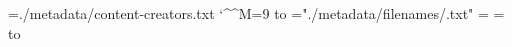 \newread\ccRead
\newread\fnameRead
\newread\fanNameRead

\newtoks\ccName
\obeylines

\openin\ccRead=./metadata/content-creators.txt
\catcode`\^^M=9
\loop
\read\ccRead to \vip
\unless\ifeof\ccRead
    \startSection\vip
    \ccName={"./metadata/filenames/\vip.txt"}
    {%
    \openin\fnameRead=\the\ccName
    \openin\fanNameRead=\the\ccName
    \loop
    \read\fnameRead to \fname
    \unless\ifeof\fnameRead
        \printTitle\fname\vip
        \readQuestion\vip\fname
        \readAnswer\vip\fname
        \repeat
    \closein\fnameRead%
    \closein\fanNameRead%
    }
\repeat
\closein\ccRead
